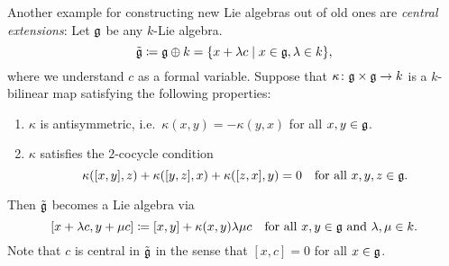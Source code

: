 Another example for constructing new Lie algebras out of old ones are \emph{central extensions}: Let $\mathfrak{g}$ be any $k$-Lie algebra.
\[
 \tilde{\mathfrak{g}}
 \coloneqq \mathfrak{g} \oplus k
 = \{x + \lambda c \mid x \in \mathfrak{g}, \lambda \in k\},
\]
where we understand $c$ as a formal variable. Suppose that $\kappa \colon \mathfrak{g} \times \mathfrak{g} \to k$ is a $k$-bilinear map satisfying the following properties:
\begin{enumerate}
 \item
  $\kappa$ is antisymmetric, i.e.\ $\kappa(x,y) = -\kappa(y,x)$ for all $x,y \in \mathfrak{g}$.
 \item
  $\kappa$ satisfies the $2$-cocycle condition
  \[
   \kappa([x,y],z) + \kappa([y,z],x) + \kappa([z,x],y) = 0
   \quad
   \text{for all $x,y,z \in \mathfrak{g}$}.
  \]
\end{enumerate}
Then $\tilde{\mathfrak{g}}$ becomes a Lie algebra via
\[
 [x + \lambda c, y + \mu c] \coloneqq [x,y] + \kappa(x,y) \lambda \mu c
 \quad \text{for all $x,y \in \mathfrak{g}$ and $\lambda, \mu \in k$.}
\]
Note that $c$ is central in $\tilde{\mathfrak{g}}$ in the sense that $[x,c] = 0$ for all $x \in \mathfrak{g}$.


